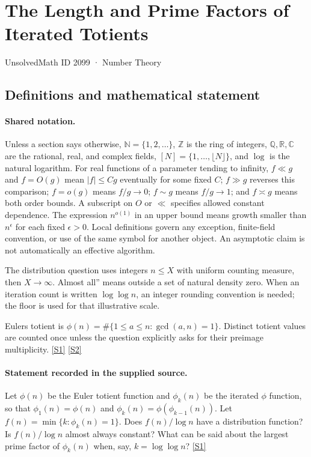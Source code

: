 \documentclass[11pt,a4paper]{article}
\newcommand{\N}{\mathbb{N}}
\newcommand{\Z}{\mathbb{Z}}
\newcommand{\Q}{\mathbb{Q}}
\newcommand{\R}{\mathbb{R}}
\newcommand{\C}{\mathbb{C}}
\newcommand{\sref}[2]{\hyperlink{source:#1:#2}{[S#2]}}
\begin{document}

\setcounter{section}{2098}

\section{The Length and Prime Factors of Iterated Totients}\label{2099}

{\small\sffamily UnsolvedMath ID 2099 · Number Theory}

\subsection{Definitions and mathematical statement}

\paragraph{Shared notation.}Unless a section says otherwise, $\N=\{1,2,\ldots\}$,
$\Z$ is the ring of integers, $\Q,\R,\C$ are the rational, real, and complex
fields, $[N]=\{1,\ldots,\lfloor N\rfloor\}$, and $\log$ is the natural
logarithm. For real functions of a parameter tending to infinity,
$f\ll g$ and $f=O(g)$ mean $|f|\leq Cg$ eventually for some fixed $C$;
$f\gg g$ reverses this comparison; $f=o(g)$ means $f/g\to0$;
$f\sim g$ means $f/g\to1$; and $f\asymp g$ means both order bounds.
A subscript on $O$ or $\ll$ specifies allowed constant dependence.
The expression $n^{o(1)}$ in an upper bound means growth smaller than
$n^\epsilon$ for each fixed $\epsilon>0$. Local definitions govern any
exception, finite-field convention, or use of the same symbol for another
object. An asymptotic claim is not automatically an effective algorithm.



The distribution question uses integers $n\leq X$ with uniform counting measure, then $X\to\infty$. Almost all'' means outside a set of natural density zero. When an iteration count is written $\log\log n$, an integer rounding convention is needed; the floor is used for that illustrative scale.

Euler\textquotesingle s totient is $\phi(n)=\#\{1\leq a\leq n:\gcd(a,n)=1\}$. Distinct totient values are counted once unless the question explicitly asks for their preimage multiplicity. \sref{2099}{1} \sref{2099}{2}

\paragraph{Statement recorded in the supplied source.}
Let $\phi(n)$ be the Euler totient function and $\phi_k(n)$ be the iterated $\phi$ function, so that $\phi_1(n)=\phi(n)$ and $\phi_k(n)=\phi(\phi_{k-1}(n))$. Let $ f(n) = \min \{ k : \phi_k(n)=1\}. $ Does $f(n)/\log n$ have a distribution function? Is $f(n)/\log n$ almost always constant? What can be said about the largest prime factor of $\phi_k(n)$ when, say, $k=\log\log n$? \sref{2099}{1}
\end{document}
